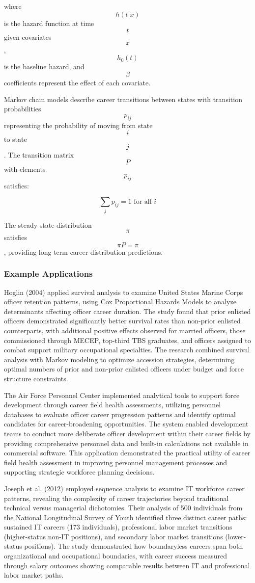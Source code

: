 \documentclass[main.tex]{subfiles}
\begin{document}
where $$h(t|x)$$ is the hazard function at time $$t$$ given covariates $$x$$, $$h_0(t)$$ is the baseline hazard, and $$\beta$$ coefficients represent the effect of each covariate\cite{hoglin2004}.

Markov chain models describe career transitions between states with transition probabilities $$p_{ij}$$ representing the probability of moving from state $$i$$ to state $$j$$. The transition matrix $$P$$ with elements $$p_{ij}$$ satisfies:

$$\sum_{j} p_{ij} = 1 \text{ for all } i$$

The steady-state distribution $$\pi$$ satisfies $$\pi P = \pi$$, providing long-term career distribution predictions\cite{otieno2020}.

\subsubsection{Example Applications}

Hoglin (2004) applied survival analysis to examine United States Marine Corps officer retention patterns, using Cox Proportional Hazards Models to analyze determinants affecting officer career duration. The study found that prior enlisted officers demonstrated significantly better survival rates than non-prior enlisted counterparts, with additional positive effects observed for married officers, those commissioned through MECEP, top-third TBS graduates, and officers assigned to combat support military occupational specialties. The research combined survival analysis with Markov modeling to optimize accession strategies, determining optimal numbers of prior and non-prior enlisted officers under budget and force structure constraints\cite{hoglin2004}.

The Air Force Personnel Center implemented analytical tools to support force development through career field health assessments, utilizing personnel databases to evaluate officer career progression patterns and identify optimal candidates for career-broadening opportunities. The system enabled development teams to conduct more deliberate officer development within their career fields by providing comprehensive personnel data and built-in calculations not available in commercial software. This application demonstrated the practical utility of career field health assessment in improving personnel management processes and supporting strategic workforce planning decisions\cite{afpc2005}.

Joseph et al. (2012) employed sequence analysis to examine IT workforce career patterns, revealing the complexity of career trajectories beyond traditional technical versus managerial dichotomies. Their analysis of 500 individuals from the National Longitudinal Survey of Youth identified three distinct career paths: sustained IT careers (173 individuals), professional labor market transitions (higher-status non-IT positions), and secondary labor market transitions (lower-status positions). The study demonstrated how boundaryless careers span both organizational and occupational boundaries, with career success measured through salary outcomes showing comparable results between IT and professional labor market paths\cite{joseph2012}.
\end{document}
